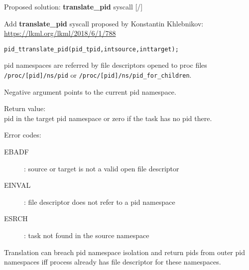 \documentclass[unicode,aspectratio=169]{beamer}
\begin{document}
\begin{frame}[fragile]{Proposed solution: \textbf{translate\_pid} syscall \hfill [\insertframenumber/\inserttotalframenumber]}
\begin{block}{Add \textbf{translate\_pid} syscall proposed by Konstantin Khlebnikov: \\ \url{https://lkml.org/lkml/2018/6/1/788}}
\begin{alltt}
pid_t translate_pid(pid_t pid, int source, int target);
\end{alltt}

pid namespaces are referred by file descriptors opened to proc files
\texttt{/proc/[pid]/ns/pid} or \texttt{/proc/[pid]/ns/pid\_for\_children}.

Negative argument points to the current pid namespace.

Return value: \\ pid in the target pid namespace or zero if the task has no pid there.

Error codes:
\begin{description}
\item[EBADF]: source or target is not a valid open file descriptor
\item[EINVAL]: file descriptor does not refer to a pid namespace
\item[ESRCH]: task not found in the source namespace
\end{description}

Translation can breach pid namespace isolation and return pids from outer pid
namespaces iff process already has file descriptor for these namespaces.
\end{block}
\end{frame}
\end{document}
